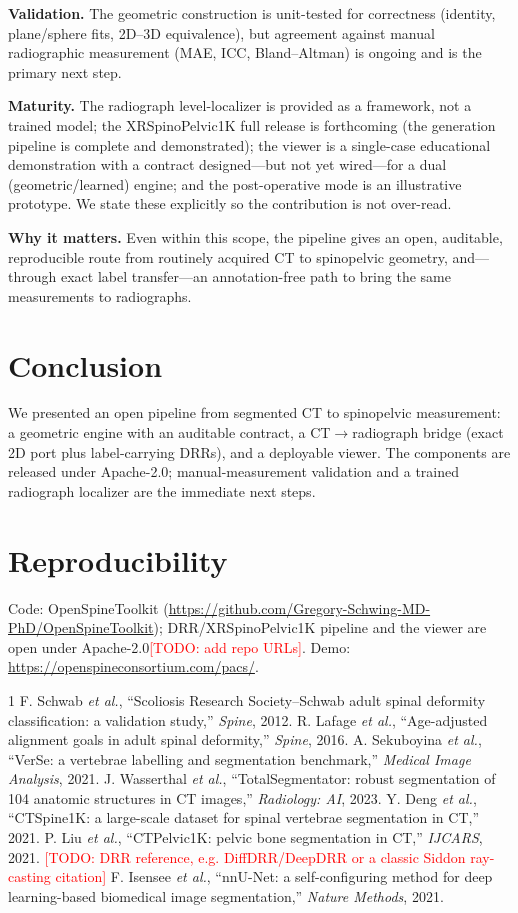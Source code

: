 \documentclass[conference]{IEEEtran}
\newcommand{\TODO}[1]{\textcolor{red}{[TODO: #1]}}
\newcommand{\xrdataset}{XRSpinoPelvic1K}
\newcommand{\ostk}{OpenSpineToolkit}
\begin{document}
\textbf{Validation.} The geometric construction is unit-tested for correctness (identity,
plane/sphere fits, 2D--3D equivalence), but agreement against manual radiographic
measurement (MAE, ICC, Bland--Altman) is ongoing and is the primary next step.

\textbf{Maturity.} The radiograph level-localizer is provided as a framework, not a trained
model; the \xrdataset{} full release is forthcoming (the generation pipeline is complete and
demonstrated); the viewer is a single-case educational demonstration with a contract
designed---but not yet wired---for a dual (geometric/learned) engine; and the
post-operative mode is an illustrative prototype. We state these explicitly so the
contribution is not over-read.

\textbf{Why it matters.} Even within this scope, the pipeline gives an open, auditable,
reproducible route from routinely acquired CT to spinopelvic geometry, and---through exact
label transfer---an annotation-free path to bring the same measurements to radiographs.

\section{Conclusion}
We presented an open pipeline from segmented CT to spinopelvic measurement: a geometric
engine with an auditable contract, a CT$\rightarrow$radiograph bridge (exact 2D port plus
label-carrying DRRs), and a deployable viewer. The components are released under Apache-2.0;
manual-measurement validation and a trained radiograph localizer are the immediate next
steps.

\section*{Reproducibility}
Code: \ostk{} (\url{https://github.com/Gregory-Schwing-MD-PhD/OpenSpineToolkit}); DRR/\xrdataset{}
pipeline and the viewer are open under Apache-2.0\TODO{add repo URLs}. Demo:
\url{https://openspineconsortium.com/pacs/}.

\begin{thebibliography}{1}
 F. Schwab \emph{et al.}, ``Scoliosis Research Society--Schwab adult
spinal deformity classification: a validation study,'' \emph{Spine}, 2012.
 R. Lafage \emph{et al.}, ``Age-adjusted alignment goals in adult
spinal deformity,'' \emph{Spine}, 2016.
 A. Sekuboyina \emph{et al.}, ``VerSe: a vertebrae labelling and
segmentation benchmark,'' \emph{Medical Image Analysis}, 2021.
 J. Wasserthal \emph{et al.}, ``TotalSegmentator: robust
segmentation of 104 anatomic structures in CT images,'' \emph{Radiology: AI}, 2023.
 Y. Deng \emph{et al.}, ``CTSpine1K: a large-scale dataset for spinal
vertebrae segmentation in CT,'' 2021.
 P. Liu \emph{et al.}, ``CTPelvic1K: pelvic bone segmentation in CT,''
\emph{IJCARS}, 2021.
 \TODO{DRR reference, e.g. DiffDRR/DeepDRR or a classic Siddon ray-casting
citation}
 F. Isensee \emph{et al.}, ``nnU-Net: a self-configuring method for deep
learning-based biomedical image segmentation,'' \emph{Nature Methods}, 2021.
\end{thebibliography}
\end{document}
